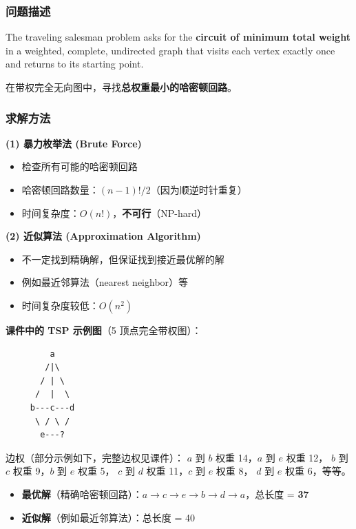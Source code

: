 \documentclass[10pt,a4paper,openany]{ctexbook}
\theoremstyle{definition}
\theoremstyle{remark}
\renewenvironment{quote}
  {\list{}{\leftmargin=1em\rightmargin=0pt\topsep=0.5pt\partopsep=0pt}\item[]}
  {\endlist}
\begin{document}
\subsubsection{问题描述}

\begin{quote}
The traveling salesman problem asks for the \textbf{circuit of minimum total weight} in a weighted, complete, undirected graph that visits each vertex exactly once and returns to its starting point.

在带权完全无向图中，寻找\textbf{总权重最小的哈密顿回路}。

\end{quote}

\subsubsection{求解方法}

\textbf{(1) 暴力枚举法 (Brute Force)}
\begin{itemize}
\item 检查所有可能的哈密顿回路
\item 哈密顿回路数量：$(n-1)!/2$（因为顺逆时针重复）
\item 时间复杂度：$O(n!)$，\textbf{不可行}（NP-hard）

\end{itemize}

\textbf{(2) 近似算法 (Approximation Algorithm)}
\begin{itemize}
\item 不一定找到精确解，但保证找到接近最优解的解
\item 例如最近邻算法（nearest neighbor）等
\item 时间复杂度较低：$O(n^2)$

\end{itemize}

\textbf{课件中的 TSP 示例图}（5 顶点完全带权图）：
{\footnotesize\begin{verbatim}
         a
        /|\
       / | \
      /  |  \
     b---c---d
      \ / \ /
       e---?
\end{verbatim}}

边权（部分示例如下，完整边权见课件）：
$a$ 到 $b$ 权重 14，$a$ 到 $e$ 权重 12，
$b$ 到 $c$ 权重 9，$b$ 到 $e$ 权重 5，
$c$ 到 $d$ 权重 11，$c$ 到 $e$ 权重 8，
$d$ 到 $e$ 权重 6，等等。
\begin{itemize}
\item \textbf{最优解}（精确哈密顿回路）：$a \to c \to e \to b \to d \to a$，总长度 = \textbf{37}
\item \textbf{近似解}（例如最近邻算法）：总长度 = 40

\end{itemize}
\end{document}
